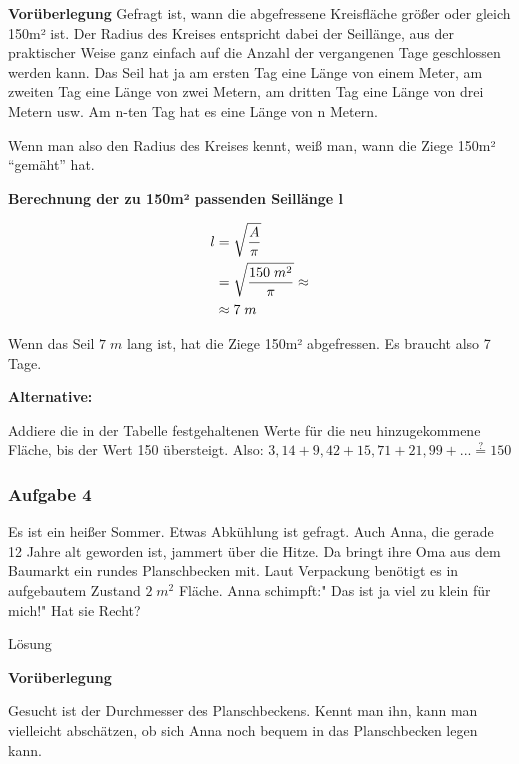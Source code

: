 \documentclass[
  ngerman,
]{book}
\begin{document}
\textbf{Vorüberlegung}
Gefragt ist, wann die abgefressene Kreisfläche größer oder gleich 150m² ist. Der Radius des Kreises entspricht dabei der Seillänge, aus der praktischer Weise ganz einfach auf die Anzahl der vergangenen Tage geschlossen werden kann. Das Seil hat ja am ersten Tag eine Länge von einem Meter, am zweiten Tag eine Länge von zwei Metern, am dritten Tag eine Länge von drei Metern usw. Am n-ten Tag hat es eine Länge von n Metern.

Wenn man also den Radius des Kreises kennt, weiß man, wann die Ziege 150m² ``gemäht'' hat.

\textbf{Berechnung der zu 150m² passenden Seillänge l}

\[\begin{align} l &= \sqrt{A\over\pi}\\
                  & = \sqrt{150\;m^2 \over \pi} \approx\\
                  &\approx 7\;m\end{align}\]

Wenn das Seil \(7\;m\) lang ist, hat die Ziege 150m² abgefressen. Es braucht also 7 Tage.

\textbf{Alternative:}

Addiere die in der Tabelle festgehaltenen Werte für die neu hinzugekommene Fläche, bis der Wert 150 übersteigt. Also:
\(3,14 + 9,42 + 15,71 + 21,99 + ...\overset{?}{=}150\)

\hypertarget{section-56}{%
\subsubsection*{}\label{section-56}}

\hypertarget{aufgabe-4-6}{%
\subsubsection*{Aufgabe 4}\label{aufgabe-4-6}}

Es ist ein heißer Sommer. Etwas Abkühlung ist gefragt. Auch Anna, die gerade 12 Jahre alt geworden ist, jammert über die Hitze. Da bringt ihre Oma aus dem Baumarkt ein rundes Planschbecken mit. Laut Verpackung benötigt es in aufgebautem Zustand \(2\;m^2\) Fläche. Anna schimpft:" Das ist ja viel zu klein für mich!" Hat sie Recht?

Lösung

\textbf{Vorüberlegung}

Gesucht ist der Durchmesser des Planschbeckens. Kennt man ihn, kann man vielleicht abschätzen, ob sich Anna noch bequem in das Planschbecken legen kann.
\end{document}
